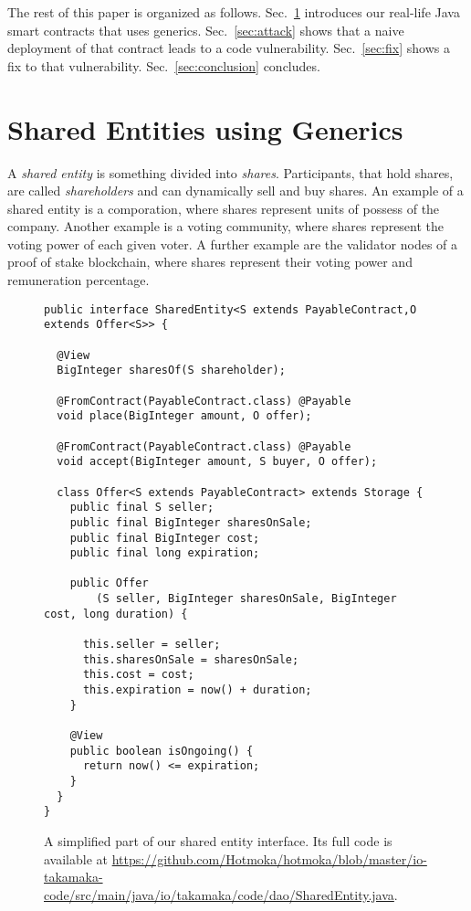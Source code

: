 \documentclass{llncs}
\begin{document}
The rest of this paper is organized as follows.
Sec.~\ref{sec:shared_entities} introduces our real-life Java smart
contracts that uses generics. Sec.~\ref{sec:attack} shows that a naive
deployment of that contract leads to a code vulnerability.
Sec.~\ref{sec:fix} shows a fix to that vulnerability.
Sec.~\ref{sec:conclusion} concludes.

\section{Shared Entities using Generics}\label{sec:shared_entities}

A \emph{shared entity} is something divided into \emph{shares}. Participants,
that hold shares, are called \emph{shareholders} and can dynamically
sell and buy shares. An example of a shared entity is a comporation,
where shares represent units of possess of the company. Another example is
a voting community, where shares represent the voting power of each given voter.
A further example are the validator nodes of a proof of stake blockchain,
where shares represent their voting power and remuneration percentage.

\begin{figure}[t]
  \begin{center}
    \begin{lstlisting}[language=Takamaka]
public interface SharedEntity<S extends PayableContract,O extends Offer<S>> {

  @View
  BigInteger sharesOf(S shareholder);

  @FromContract(PayableContract.class) @Payable
  void place(BigInteger amount, O offer);

  @FromContract(PayableContract.class) @Payable
  void accept(BigInteger amount, S buyer, O offer);

  class Offer<S extends PayableContract> extends Storage {
    public final S seller;
    public final BigInteger sharesOnSale;
    public final BigInteger cost;
    public final long expiration;

    public Offer
        (S seller, BigInteger sharesOnSale, BigInteger cost, long duration) {

      this.seller = seller;
      this.sharesOnSale = sharesOnSale;
      this.cost = cost;
      this.expiration = now() + duration;
    }

    @View
    public boolean isOngoing() {
      return now() <= expiration;
    }
  }
}
    \end{lstlisting}
  \end{center}
  \caption{A simplified part of our shared entity interface.
  Its full code is available at \url{https://github.com/Hotmoka/hotmoka/blob/master/io-takamaka-code/src/main/java/io/takamaka/code/dao/SharedEntity.java}.}\label{fig:shared_entity}
\end{figure}
\end{document}
